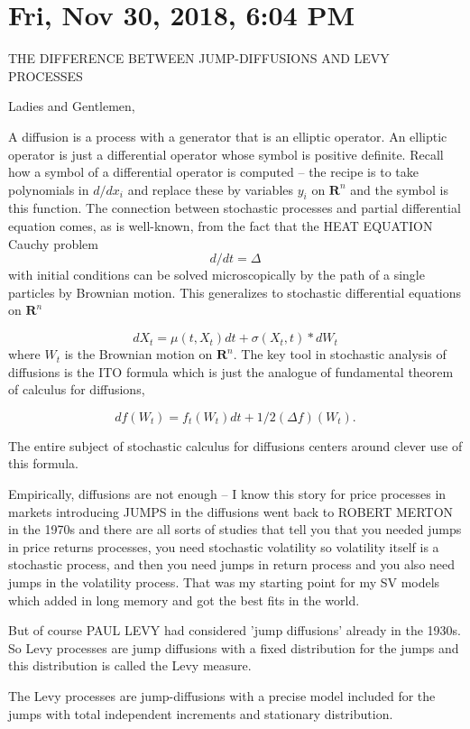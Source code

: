 \documentclass{amsart}
\begin{document}
\section{Fri, Nov 30, 2018, 6:04 PM}
THE DIFFERENCE BETWEEN JUMP-DIFFUSIONS AND LEVY PROCESSES

Ladies and Gentlemen,

A diffusion is a process with a generator that is an elliptic operator.  An elliptic operator is just a differential operator whose symbol is positive definite.  Recall how a symbol of a differential operator is computed -- the recipe is to take polynomials in $d/dx_i$ and replace these by variables $y_i$ on $\mathbf{R}^n$ and the symbol is this function.  The connection between stochastic processes and partial differential equation comes, as is well-known, from the fact that the HEAT EQUATION Cauchy problem 
\[
d/dt = \Delta
\]
with initial conditions can be solved microscopically by the path of a single particles by Brownian motion.  This generalizes to stochastic differential equations on $\mathbf{R}^n$

\[
dX_t = \mu(t,X_t) dt + \sigma(X_t,t)*dW_t
\]
where $W_t$ is the Brownian motion on $\mathbf{R}^n$.  The key tool in stochastic analysis of diffusions is the ITO formula which is just the analogue of fundamental theorem of calculus for diffusions, 

\[
df(W_t) = f_t(W_t) dt + 1/2 (\Delta f)(W_t).
\]
  
The entire subject of stochastic calculus for diffusions centers around clever use of this formula.  

Empirically, diffusions are not enough -- I know this story for price processes in markets introducing JUMPS in the diffusions went back to ROBERT MERTON in the 1970s and there are all sorts of studies that tell you that you needed jumps in price returns processes, you need stochastic volatility so volatility itself is a stochastic process, and then you need jumps in return process and you also need jumps in the volatility process.  That was my starting point for my SV models which added in long memory and got the best fits in the world.

But of course PAUL LEVY had considered 'jump diffusions' already in the 1930s.  So Levy processes are jump diffusions with a fixed distribution for the jumps and this distribution is called the Levy measure.  

The Levy processes are jump-diffusions with a precise model included for the jumps with total independent increments and stationary distribution.  
\end{document}
